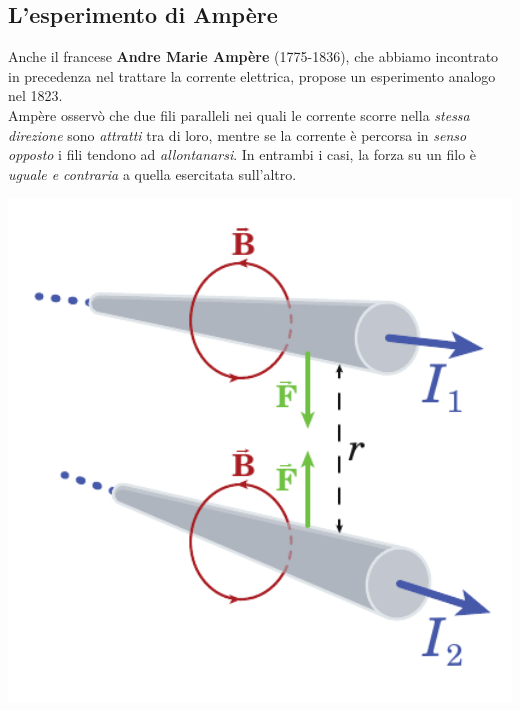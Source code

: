 \subsection{L'esperimento di Ampère}\label{EsperimentodiAmpere}
Anche il francese \textbf{Andre Marie Ampère} (1775-1836), che abbiamo incontrato in precedenza nel trattare la corrente elettrica, propose un esperimento analogo nel 1823.\\
Ampère osservò che due fili paralleli nei quali le corrente scorre nella \textit{stessa direzione} sono \textit{attratti} tra di loro, mentre se la corrente è percorsa in \textit{senso opposto} i fili tendono ad \textit{allontanarsi}. In entrambi i casi, la forza su un filo è \textit{uguale e contraria} a quella esercitata sull'altro.\\
\begin{minipage}{0.49\textwidth}
	\begin{center}
		\includegraphics[width=1\textwidth]{images/chp7/chp7ampere1.pdf}
	\end{center}
\end{minipage}
